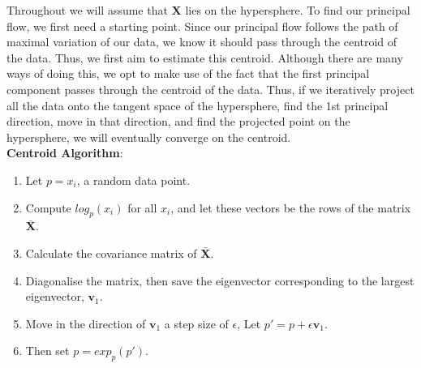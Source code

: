 \documentclass[12pt]{report}
\begin{document}
Throughout we will assume that $\mathbf{X}$ lies on the hypersphere. 
To find our principal flow, we first need a starting point. Since our principal flow 
follows the path of maximal variation of our data, 
we know it should pass through the centroid of the data. 
Thus, we first aim to estimate this centroid.
Although there are many ways of doing this, we opt to make use of the fact that 
the first principal component passes through the centroid of the data. Thus, if we 
iteratively project all the data onto the tangent space of the hypersphere, 
find the 1st principal direction, move in that direction, 
and find the projected point on the hypersphere, we will eventually converge on the 
centroid.
\\
\textbf{Centroid Algorithm}:
\begin{enumerate}
    \item Let $p = x_i$, a random data point.
    \item Compute $log_p(x_i)$ for all $x_i$, 
    and let these vectors be the rows of the matrix $\bar{\mathbf{X}}$.
    \item Calculate the covariance matrix of $\bar{\mathbf{X}}$.
    \item Diagonalise the matrix, 
    then save the eigenvector corresponding to the largest eigenvector, 
    $\mathbf{v}_1$.
    \item Move in the direction of $\mathbf{v}_1$ a step size of $\epsilon$, 
    Let $p' = p + \epsilon \mathbf{v}_1$.
    \item Then set $p = exp_p(p')$.
\end{enumerate}
\end{document}
